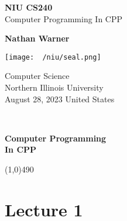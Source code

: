 \documentclass{report}
\title{\Huge{}}
\author{\huge{Nathan Warner}}
\date{\huge{}}
\begin{document}
        \begin{titlepage}
       \begin{center}
           \vspace*{1cm}
    
           \textbf{NIU CS240} \\
           Computer Programming In CPP
    
           \vspace{0.5cm}
            
                
           \vspace{1.5cm}
             
           \textbf{Nathan Warner}
    
           \vfill
                
                
           \vspace{0.8cm}
         
           \texttt{[image: ~/niu/seal.png]}
                
           Computer Science \\
           Northern Illinois University\\
           August 28, 2023
           United States\\
           
                
       \end{center}
    \end{titlepage}
    \tableofcontent 
    \pagebreak \bigbreak \noindent 
    \vspace{2in} \\
    \begin{Huge}
       \textbf{Computer Programming \\
       In CPP} 
    \end{Huge}
    \bigbreak \noindent 
    \line(1,0){490}
    
    \bigbreak \noindent \bigbreak \noindent 
    \section{Lecture 1}
    \bigbreak \noindent 
\end{document}
